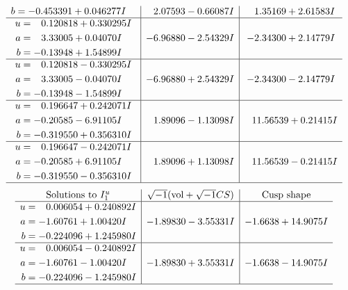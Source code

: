 \documentclass[1p]{elsarticle_modified}
\theoremstyle{definition}
\newcommand{\I}{\sqrt{-1}}
\begin{document}
$$\begin{array}{c|c|c}
\begin{aligned}
b &= -0.453391 + 0.046277 I\end{aligned}
 & \phantom{-}2.07593 - 0.66087 I & \phantom{-}1.35169 + 2.61583 I \\ \hline\begin{aligned}
u &= \phantom{-}0.120818 + 0.330295 I \\
a &= \phantom{-}3.33005 + 0.04070 I \\
b &= -0.13948 + 1.54899 I\end{aligned}
 & -6.96880 - 2.54329 I & -2.34300 + 2.14779 I \\ \hline\begin{aligned}
u &= \phantom{-}0.120818 - 0.330295 I \\
a &= \phantom{-}3.33005 - 0.04070 I \\
b &= -0.13948 - 1.54899 I\end{aligned}
 & -6.96880 + 2.54329 I & -2.34300 - 2.14779 I \\ \hline\begin{aligned}
u &= \phantom{-}0.196647 + 0.242071 I \\
a &= -0.20585 - 6.91105 I \\
b &= -0.319550 + 0.356310 I\end{aligned}
 & \phantom{-}1.89096 - 1.13098 I & \phantom{-}11.56539 + 0.21415 I \\ \hline\begin{aligned}
u &= \phantom{-}0.196647 - 0.242071 I \\
a &= -0.20585 + 6.91105 I \\
b &= -0.319550 - 0.356310 I\end{aligned}
 & \phantom{-}1.89096 + 1.13098 I & \phantom{-}11.56539 - 0.21415 I\\
 \hline 
 \end{array}$$\newpage$$\begin{array}{c|c|c}  
\text{Solutions to }I^u_{1}& \I (\text{vol} + \sqrt{-1}CS) & \text{Cusp shape}\\
 \hline 
\begin{aligned}
u &= \phantom{-}0.006054 + 0.240892 I \\
a &= -1.60761 + 1.00420 I \\
b &= -0.224096 + 1.245980 I\end{aligned}
 & -1.89830 - 3.55331 I & -1.6638 + 14.9075 I \\ \hline\begin{aligned}
u &= \phantom{-}0.006054 - 0.240892 I \\
a &= -1.60761 - 1.00420 I \\
b &= -0.224096 - 1.245980 I\end{aligned}
 & -1.89830 + 3.55331 I & -1.6638 - 14.9075 I\\
 \hline 
 \end{array}$$\newpage\newpage\renewcommand{\arraystretch}{1}
\end{document}
